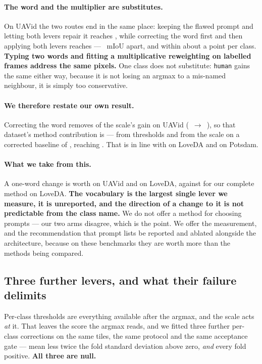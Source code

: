\documentclass[10pt,twocolumn,letterpaper]{article}          %
\newcommand{\best}[1]{\textbf{#1}}
\begin{document}
\paragraph{The word and the multiplier are substitutes.} On UAVid the two routes end
in the same place: keeping the flawed prompt and letting both levers repair it reaches
\vocRouteA{}, while correcting the word first and then applying both levers reaches
\vocRouteB{} --- \vocRouteDelta{}~mIoU apart, and within about a point per class.
\best{Typing two words and fitting a multiplicative reweighting on \uavTrainTiles{}
labelled frames address the same pixels.} One class does not substitute:
\texttt{human} gains the same either way, because it is not losing an argmax to a
mis-named neighbour, it is simply too conservative.

\paragraph{We therefore restate our own result.} Correcting the word removes
\uavScaleLost{} of the scale's gain on UAVid (\uavScaleTrans{}~$\to$~\uavCorrTwo{}),
so that dataset's method contribution is \best{\uavCorrMethod{}} --- \uavCorrOne{}
from thresholds and \uavCorrTwo{} from the scale on a corrected baseline of
\uavCorrBase{}, reaching \uavCorrFinal{}. That is in line with \loveTotal{} on LoveDA
and \potsTotal{} on Potsdam.

\paragraph{What we take from this.} A one-word change is worth \vocUavGain{} on UAVid
and \vocLoveBarren{} on LoveDA, against \loveTotal{} for our complete method on
LoveDA. \best{The vocabulary is the largest single lever we measure, it is unreported,
and the direction of a change to it is not predictable from the class name.} We do not
offer a method for choosing prompts --- our two arms disagree, which is the point. We
offer the measurement, and the recommendation that prompt lists be reported and
ablated alongside the architecture, because on these benchmarks they are worth more
than the methods being compared.

\subsection{Three further levers, and what their failure delimits}
\label{sec:levers}

Per-class thresholds are everything available after the argmax, and the scale acts
\emph{at} it. That leaves the score the argmax reads, and we fitted three further
per-class corrections on the same tiles, the same protocol and the same acceptance
gate --- mean less twice the fold standard deviation above zero, \emph{and} every
fold positive. \best{All three are null.}
\end{document}
